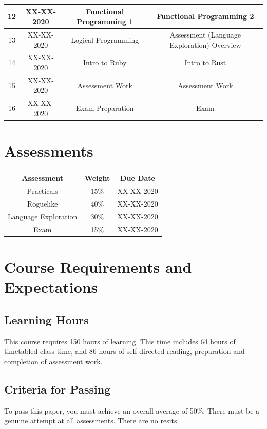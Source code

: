\documentclass{article}
\begin{document}
\begin{tabular}{|c|c|c|c|}
  12            & XX-XX-2020    & Functional Programming 1       & Functional Programming 2                   \\ \hline
  13            & XX-XX-2020    & Logical Programming            & Assessment (Language Exploration) Overview \\ \hline
  14            & XX-XX-2020    & Intro to Ruby                  & Intro to Rust                              \\ \hline
  15            & XX-XX-2020    & Assessment Work                & Assessment Work                            \\ \hline
  16            & XX-XX-2020    & Exam Preparation               & Exam                                       \\ \hline
\end{tabular}

\section*{Assessments}
\renewcommand{\arraystretch}{1.5}
\begin{tabular}{|c|c|c|}
  \hline
  \textbf{Assessment}  & \textbf{Weight} & \textbf{Due Date} \\ \hline
  Practicals           & 15\%            & XX-XX-2020        \\ \hline
  Roguelike            & 40\%            & XX-XX-2020        \\ \hline
  Language Exploration & 30\%            & XX-XX-2020        \\ \hline
  Exam                 & 15\%            & XX-XX-2020        \\ \hline
\end{tabular}

\section*{Course Requirements and Expectations}

\subsection*{Learning Hours}
This course requires 150 hours of learning. This time includes 64 hours of timetabled class time, and 86 hours of self-directed reading, preparation and completion of assessment work.

\subsection*{Criteria for Passing}
To pass this paper, you must achieve an overall average of 50\%. There must be a genuine attempt at all assessments. There are no resits.
\end{document}
